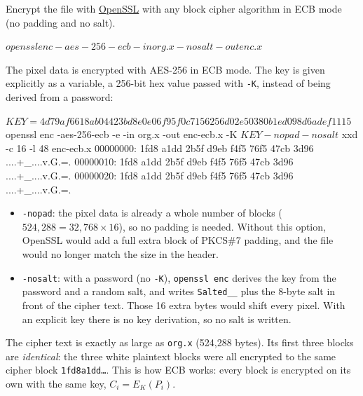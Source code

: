 \documentclass[a4paper, 10pt]{article}
\begin{document}
\begin{problem}
\begin{subproblems_alpha}
	\item Encrypt the file with \href{https://wiki.openssl.org/index.php/Enc}{OpenSSL} with any block cipher algorithm in ECB mode (no padding and no salt).
	      \begin{codingbox}[language=bash, deletekeywords={in}]
$ openssl enc -aes-256-ecb -in org.x -nosalt -out enc.x
$
\end{codingbox}
	      \myspace[v][3][mm]
	      \begin{solution}
		      The pixel data is encrypted with AES-256 in ECB mode.
		      The key is given explicitly as a variable, a 256-bit hex value passed with \texttt{-K}, instead of being derived from a password:
		      \begin{codingbox*}[language=bash, deletekeywords={in}, numbers=none, xleftmargin=0pt, belowskip=6pt]
$ KEY=4d79af6618ab04423bd8e0e06f95f0c7156256d02e50380b1ed098d6adef1115
$ openssl enc -aes-256-ecb -e -in org.x -out enc-ecb.x -K $KEY -nopad -nosalt
$ xxd -c 16 -l 48 enc-ecb.x
00000000: 1fd8 a1dd 2b5f d9eb f4f5 76f5 47cb 3d96  ....+_....v.G.=.
00000010: 1fd8 a1dd 2b5f d9eb f4f5 76f5 47cb 3d96  ....+_....v.G.=.
00000020: 1fd8 a1dd 2b5f d9eb f4f5 76f5 47cb 3d96  ....+_....v.G.=.
\end{codingbox*}
		      \begin{itemize}
			      \item \texttt{-nopad}: the pixel data is already a whole number of blocks ($524{,}288 = 32{,}768 \times 16$), so no padding is needed.
			            Without this option, OpenSSL would add a full extra block of PKCS\#7 padding, and the file would no longer match the size in the header.
			      \item \texttt{-nosalt}: with a password (no \texttt{-K}), \texttt{openssl enc} derives the key from the password and a random salt,
			            and writes \texttt{Salted\_\_} plus the 8-byte salt in front of the cipher text.
			            Those 16 extra bytes would shift every pixel.
			            With an explicit key there is no key derivation, so no salt is written.
		      \end{itemize}
		      The cipher text is exactly as large as \texttt{org.x} (524{,}288 bytes).
		      Its first three blocks are \emph{identical}: the three white plaintext blocks were all encrypted to the same cipher block \texttt{1fd8a1dd\ldots}.
		      This is how ECB works: every block is encrypted on its own with the same key, $C_i = E_K(P_i)$.
	      \end{solution}
	      \myspace[v][3][mm]


\end{subproblems_alpha}
\end{problem}
\end{document}
